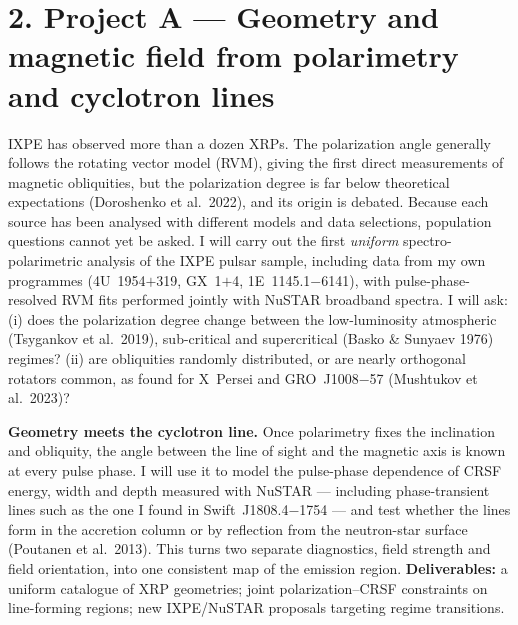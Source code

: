 \documentclass[11pt]{article}
\begin{document}
\section*{2. Project A --- Geometry and magnetic field from polarimetry and cyclotron lines}
IXPE has observed more than a dozen XRPs. The polarization angle generally follows the
rotating vector model (RVM), giving the first direct measurements of magnetic
obliquities, but the polarization degree is far below theoretical expectations
(Doroshenko et al.\ 2022), and its origin is debated. Because each source has been
analysed with different models and data selections, population questions cannot yet be
asked. I will carry out the first \emph{uniform} spectro-polarimetric analysis of the
IXPE pulsar sample, including data from my own programmes (4U~1954$+$319, GX~1$+$4,
1E~1145.1$-$6141), with pulse-phase-resolved RVM fits performed jointly with NuSTAR
broadband spectra. I will ask: (i) does the polarization degree change between the
low-luminosity atmospheric (Tsygankov et al.\ 2019), sub-critical and supercritical
(Basko \& Sunyaev 1976) regimes? (ii) are obliquities randomly distributed, or are
nearly orthogonal rotators common, as found for X~Persei and GRO~J1008$-$57
(Mushtukov et al.\ 2023)?
\par
\textbf{Geometry meets the cyclotron line.} Once polarimetry fixes the inclination and
obliquity, the angle between the line of sight and the magnetic axis is known at every
pulse phase. I will use it to model the pulse-phase dependence of CRSF energy, width and
depth measured with NuSTAR --- including phase-transient lines such as the one I found
in Swift~J1808.4$-$1754 --- and test whether the lines form in the accretion column or
by reflection from the neutron-star surface (Poutanen et al.\ 2013). This turns two
separate diagnostics, field strength and field orientation, into one consistent map of
the emission region.
\textbf{Deliverables:} a uniform catalogue of XRP geometries; joint
polarization--CRSF constraints on line-forming regions; new IXPE/NuSTAR proposals
targeting regime transitions.
\end{document}
